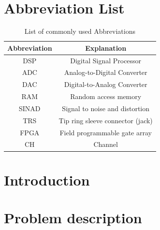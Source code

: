\documentclass[11pt, a4paper]{report}
\begin{document}
\begin{justify}


\newpage
\tableofcontents
\thispagestyle{empty}

\listoffigures
\thispagestyle{empty}


\listoftables
\thispagestyle{empty}

\newpage
\pagestyle{plain}
\setcounter{page}{1}

\chapter*{Abbreviation List}

\begin{table}[!h]
	\centering
\begin{tabular}{|c|c|}
	\hline
\textbf{Abbreviation} & \textbf{Explanation}        \\ \hline
DSP 					& Digital Signal Processor    \\ \hline
ADC 					& Analog-to-Digital Converter \\ \hline
DAC 					& Digital-to-Analog Converter \\ \hline
RAM 					& Random access memory	    \\ \hline
SINAD 					& Signal to noise and distortion \\ \hline
TRS 					& Tip ring sleeve connector (jack) \\ \hline
FPGA 					& Field programmable gate array \\ \hline
CH 						& Channel					\\ \hline

\end{tabular}
\caption{List of commonly used Abbreviations}
\label{Abbreviation list}
\end{table}



    \chapter{Introduction}
    

    \chapter{Problem description}
    


\end{justify}
\end{document}
